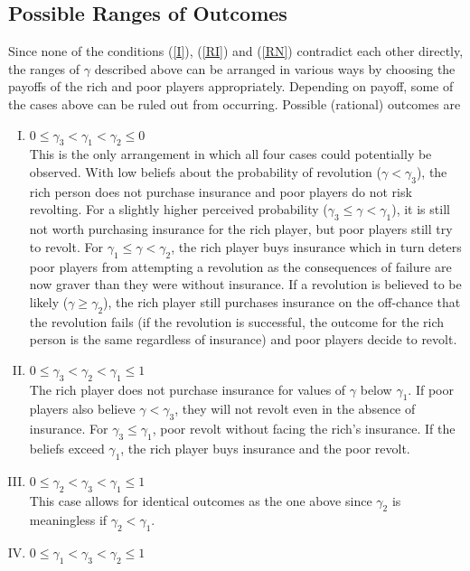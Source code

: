 \documentclass[12pt]{article}
\begin{document}
	\subsection{Possible Ranges of Outcomes}
	Since none of the conditions (\ref{I}), (\ref{RI}) and (\ref{RN}) 
	contradict each other directly, the ranges of $\gamma$ described above can 
	be arranged in various ways by choosing the payoffs of the rich and poor 
	players appropriately. Depending on payoff, some of the cases above can be 
	ruled out from occurring. Possible (rational) outcomes are
	\begin{enumerate}[I.]
		\item 	$0 \leq \gamma_3 < \gamma_1 < \gamma_2 \leq 0$\\
				This is the only arrangement in which all four cases could 
				potentially be observed. With low beliefs about the probability 
				of revolution ($\gamma<\gamma_3$), the rich person does not 
				purchase insurance and poor players do not risk revolting. For 
				a slightly higher perceived probability 
				($\gamma_3\leq\gamma<\gamma_1$), it is still not worth 
				purchasing insurance for the rich player, but poor players 
				still try to revolt. For $\gamma_1\leq\gamma<\gamma_2$, the 
				rich player buys insurance which in turn deters poor players 
				from attempting a revolution as the consequences of failure are 
				now graver than they were without insurance. If a revolution is 
				believed to be likely ($\gamma\geq\gamma_2$), the rich player 
				still purchases insurance on the off-chance that the revolution 
				fails (if the revolution is successful, the outcome for the 
				rich person is the same regardless of insurance) and poor 
				players decide to revolt.
		\item	$0 \leq \gamma_3 < \gamma_2 < \gamma_1 \leq 1$\\
				The rich player does not purchase insurance for values of 
				$\gamma$ below $\gamma_1$. If poor players also believe 
				$\gamma<\gamma_3$, they will not revolt even in the absence of 
				insurance. For $\gamma_3\leq\gamma_1$, poor revolt without 
				facing the rich's insurance. If the beliefs exceed $\gamma_1$, 
				the rich player buys insurance and the poor revolt.
		\item	$0 \leq \gamma_2 < \gamma_3 < \gamma_1 \leq 1$\\
				This case allows for identical outcomes as the one above since 
				$\gamma_2$ is meaningless if $\gamma_2<\gamma_1$.
		\item	$0 \leq \gamma_1 < \gamma_3 < \gamma_2 \leq 1$\\

\end{enumerate}
\end{document}
